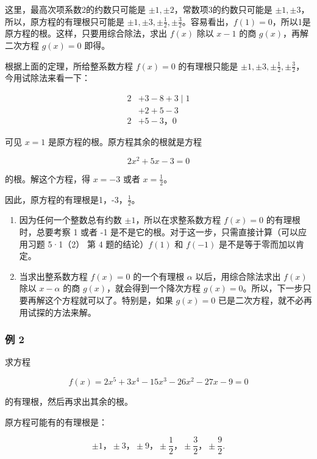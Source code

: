 这里，最高次项系数2的约数只可能是
\(\pm 1, \pm 2\)，常数项3的约数只可能是
\(\pm 1, \pm 3\)，所以，原方程的有理根只可能是
\(\pm 1, \pm 3, \pm \frac{1}{2}, \pm \frac{3}{2}\)。容易看出，\(f(1) = 0\)，所以1是原方程的根。这样，只要用综合除法，求出
\(f(x)\) 除以 \(x - 1\) 的商 \(g(x)\)，再解二次方程 \(g(x) = 0\) 即得。

 根据上面的定理，所给整系数方程 \(f(x) = 0\)
的有理根只能是
\(\pm 1, \pm 3, \pm \frac{1}{2}, \pm \frac{3}{2}\)，今用试除法来看一下：

\[
\begin{array}{rl} {2} & {+ 3 - 8 + 3 \mid 1} \\ & {+ 2 + 5 - 3} \\ \hline {2} & {+ 5 - 3\text{，} 0} \end{array}
\]

可见 \(x = 1\) 是原方程的根。原方程其余的根就是方程

\[
2 x ^ {2} + 5 x - 3 = 0
\]

的根。解这个方程，得 \(x = -3\) 或者 \(x = \frac{1}{2}\)。

因此，原方程的有理根是1，-3，\(\frac{1}{2}\)。


\begin{enumerate}
\item
  因为任何一个整数总有约数 \(\pm 1\)，所以在求整系数方程 \(f(x) = 0\)
  的有理根时，总要考察 1 或者 -1
  是不是它的根。对于这一步，只需直接计算（可以应用习题 5·1（2） 第 4
  题的结论）\(f(1)\) 和 \(f(-1)\) 是不是等于零而加以肯定。
\item
  当求出整系数方程 \(f(x) = 0\) 的一个有理根 \(\alpha\)
  以后，用综合除法求出 \(f(x)\) 除以 \(x - \alpha\) 的商
  \(g(x)\)，就会得到一个降次方程
  \(g(x) = 0\)。所以，下一步只要再解这个方程就可以了。特别是，如果
  \(g(x) = 0\) 已是二次方程，就不必再用试探的方法来解。
\end{enumerate}

\subsubsection{例 2}

求方程

\[
f (x) = 2 x ^ {5} + 3 x ^ {4} - 15 x ^ {3} - 26 x ^ {2} - 27 x - 9 = 0
\]

的有理根，然后再求出其余的根。

 原方程可能有的有理根是：

\[
\pm 1\text{，} \pm 3\text{，} \pm 9\text{，} \pm \frac {1}{2}\text{，} \pm \frac {3}{2}\text{，} \pm \frac {9}{2}.
\]

